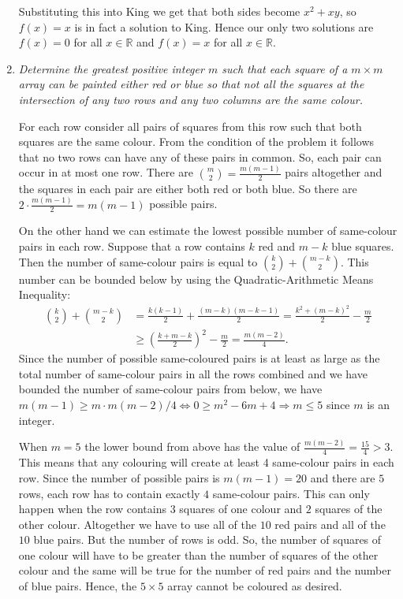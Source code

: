\documentclass[a4paper,12pt]{article}
\begin{document}
\begin{enumerate}
	Substituting this into King we get that both sides become $x^2+xy$, so $f(x)=x$ is in fact a solution to King. Hence our only two solutions are $f(x)=0$ for all $x\in\mathbb{R}$ and $f(x)=x$ for all $x\in\mathbb{R}$.
	
	\item %
	\textit{Determine the greatest positive integer $m$ such that each square of a $m\times m$ array can be painted either red or blue so that not all the squares at the intersection of any two rows and any two columns are the same colour.}
	
	For each row consider all pairs of squares from this row such that both squares are the same colour. From the condition of the problem it follows that no two rows can have any of these pairs in common. So, each pair can occur in at most one row. There are $\binom{m}{2} = \frac{m(m-1)}{2}$ pairs altogether and the squares in each pair are either both red or both blue. So there are $2 \cdot \frac{m(m-1)}{2} = m(m - 1)$ possible pairs.
	
	On the other hand we can estimate the lowest possible number of same-colour pairs in each row. Suppose that a row contains $k$ red and $m-k$ blue squares. Then the number of same-colour pairs is equal to $\binom{k}{2} + \binom{m-k}{2}$. This number can be bounded below by using the Quadratic-Arithmetic Means Inequality:
	\begin{align*} \binom{k}{2}+\binom{m-k}{2} &= \frac{k(k-1)}{2} +\frac{(m-k)(m-k-1)}{2} = \frac{k^2+(m-k)^2}{2} -\frac{m}{2} \\ &\geq \left(\frac{k+m-k}{2}\right)^2 -\frac{m}{2} = \frac{m(m-2)}{4}. \end{align*}
	Since the number of possible same-coloured pairs is at least as large as the total number of same-colour pairs in all the rows combined and we have bounded the number of same-colour pairs from below, we have $m(m-1) \geq m\cdot m(m-2)/4 \iff 0 \geq m^2-6m+4 \Rightarrow m \leq 5$ since $m$ is an integer.
	
	When $m = 5$ the lower bound from above has the value of $\frac{m(m-2)}{4} = \frac{15}{4} > 3$. This means that any colouring will create at least 4 same-colour pairs in each row. Since the number of possible pairs is $m(m-1) = 20$ and there are $5$ rows, each row has to contain exactly $4$ same-colour pairs. This can only happen when the row contains $3$ squares of one colour and $2$ squares of the other colour. Altogether we have to use all of the $10$ red pairs and all of the $10$ blue pairs. But the number of rows is odd. So, the number of squares of one colour will have to be greater than the number of squares of the other colour and the same will be true for the number of red pairs and the number of blue pairs. Hence, the $5 \times 5$ array cannot be coloured as desired.
	

\end{enumerate}
\end{document}
